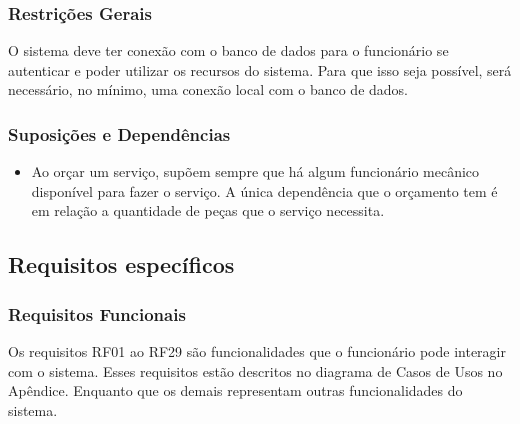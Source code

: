 	\subsubsection{Restrições Gerais}
	\par
	O sistema deve ter conexão com o banco de dados para o funcionário se autenticar e poder utilizar os recursos do sistema. Para que isso seja possível, será necessário, no mínimo, uma conexão local com o banco de dados.
	
	\subsubsection{Suposições e Dependências}
		\begin{itemize}
			\item Ao orçar um serviço, supõem sempre que há algum funcionário mecânico disponível para fazer o serviço. A única dependência que o orçamento tem é em relação a quantidade de peças que o serviço necessita.		
		\end{itemize}
	
	
\subsection{Requisitos específicos}

\subsubsection{Requisitos Funcionais}

\par
Os requisitos RF01 ao RF29 são funcionalidades que o funcionário pode interagir com o sistema. Esses requisitos estão descritos no diagrama de Casos de Usos no Apêndice. Enquanto que os demais representam outras funcionalidades do sistema.

